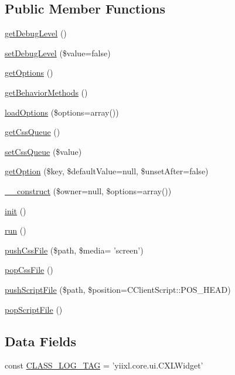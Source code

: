 \subsection*{Public Member Functions}
\begin{DoxyCompactItemize}
\item 
\hyperlink{classCXLWidget_a122db96cedfc221cf187ce4328f992f7}{getDebugLevel} ()
\item 
\hyperlink{classCXLWidget_a91ba7d911e2c3852a048f4022c45ec9e}{setDebugLevel} (\$value=false)
\item 
\hyperlink{classCXLWidget_a1a49b8dded6e91a52e2fd07195d334da}{getOptions} ()
\item 
\hyperlink{classCXLWidget_a50138660370da467322f8f3965008b14}{getBehaviorMethods} ()
\item 
\hyperlink{classCXLWidget_ad51d235c20d44a485f9f00f2c86a5ea9}{loadOptions} (\$options=array())
\item 
\hyperlink{classCXLWidget_a6bcc7276fdf47bc15f4eb9d97edb362b}{getCssQueue} ()
\item 
\hyperlink{classCXLWidget_a7ad34c754d0c507d838fab157bc04407}{setCssQueue} (\$value)
\item 
\hyperlink{classCXLWidget_ad1145e067eca389073867be1a9d5d57e}{getOption} (\$key, \$defaultValue=null, \$unsetAfter=false)
\item 
\hyperlink{classCXLWidget_af60059523d063ad74a670eec2a1caa36}{\_\-\_\-construct} (\$owner=null, \$options=array())
\item 
\hyperlink{classCXLWidget_a4be4055f3361d4800e16bc2e2e38cda6}{init} ()
\item 
\hyperlink{classCXLWidget_afb0fafe7e02a3ae1993c01c19fad2bae}{run} ()
\item 
\hyperlink{classCXLWidget_a563c3cfa2400bfb9cdb5af4777251d47}{pushCssFile} (\$path, \$media= 'screen')
\item 
\hyperlink{classCXLWidget_a836a112a31fa378be05d375ddf67a0c6}{popCssFile} ()
\item 
\hyperlink{classCXLWidget_a4589f8bb22c9e9837302ea2cc7c80570}{pushScriptFile} (\$path, \$position=CClientScript::POS\_\-HEAD)
\item 
\hyperlink{classCXLWidget_ab4b1e02bb3e8bab82c822ff04c43d12e}{popScriptFile} ()
\end{DoxyCompactItemize}
\subsection*{Data Fields}
\begin{DoxyCompactItemize}
\item 
const \hyperlink{classCXLWidget_aa607ab5e557e6ebb60b85c5a20ad067f}{CLASS\_\-LOG\_\-TAG} = 'yiixl.core.ui.CXLWidget'
\end{DoxyCompactItemize}

